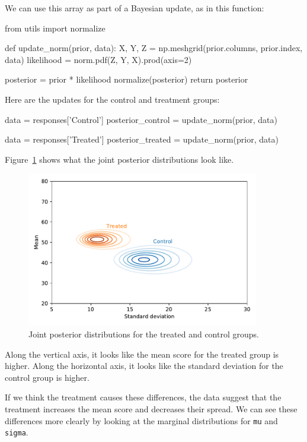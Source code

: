 \documentclass[12pt]{book}
\theoremstyle{exercise}
\newcommand{\py}[1]{{\tt #1}}%
\begin{document}
We can use this array as part of a Bayesian update, as in this function:

\begin{code}
from utils import normalize

def update_norm(prior, data):
    X, Y, Z = np.meshgrid(prior.columns, prior.index, data)
    likelihood = norm.pdf(Z, Y, X).prod(axis=2)

    posterior = prior * likelihood
    normalize(posterior)
    return posterior
\end{code}

Here are the updates for the control and treatment groups:

\begin{code}
data = responses['Control']
posterior_control = update_norm(prior, data)

data = responses['Treated']
posterior_treated = update_norm(prior, data)
\end{code}

Figure~\ref{fig11-02} shows what the joint posterior distributions look like.

\begin{figure}
\centerline{\includegraphics[width=4in]{figs/fig11-02.pdf}}
\caption{Joint posterior distributions for the treated and control groups.}
\label{fig11-02}
\end{figure}

Along the vertical axis, it looks like the mean score for the treated
group is higher. Along the horizontal axis, it looks like the standard
deviation for the control group is higher.

If we think the treatment causes these differences, the data suggest
that the treatment increases the mean score and decreases their spread.
We can see these differences more clearly by looking at the marginal
distributions for \py{mu} and
\py{sigma}.
\end{document}
